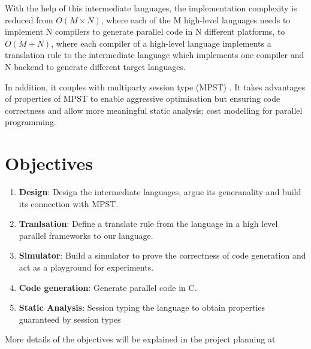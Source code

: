 With the help of this intermediate languages, the implementation complexity is reduced from $O(M \times N)$, where each of the M high-level languages needs to implement N compilers to generate parallel code in N different platforms, to $O(M + N)$, where each compiler of a high-level language implements a translation rule to the intermediate language which implements one compiler and N backend to generate different target languages.

In addition, it couples with multiparty session type (MPST) \cite{coppoGentleIntroductionMultiparty2015}. It takes advantages of properties of MPST to enable aggressive optimisation but ensuring code correctness and allow more meaningful static analysis; \eg cost modelling for parallel programming. %

\section{Objectives}
\begin{enumerate}
\item \textbf{Design}: Design the intermediate languages, argue its generanality and build its connection with MPST. 
\item \textbf{Tranlsation}: Define a translate rule from the language in a high level parallel frameworks to our language. 
\item \textbf{Simulator}: Build a simulator to prove the correctness of code generation and act as a playground for experiments.
\item \textbf{Code generation}: Generate parallel code in C.
\item \textbf{Static Analysis}: Session typing the language to obtain properties guaranteed by session types%
\end{enumerate}
More details of the objectives will be explained in the project planning at 